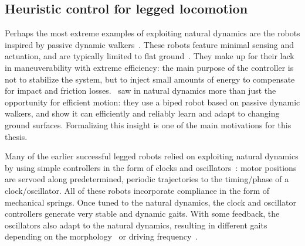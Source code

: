 \subsection{Heuristic control for legged locomotion}



Perhaps the most extreme examples of exploiting natural dynamics are the robots inspired by passive dynamic walkers~\cite{mcgeer1990passive}. These robots feature minimal sensing and actuation, and are typically limited to flat ground~\cite{bhounsule2012design,wisse2006design}. They make up for their lack in maneuverability with extreme efficiency: the main purpose of the controller is not to stabilize the system, but to inject small amounts of energy to compensate for impact and friction losses.~\textcite{tedrake2005learning} saw in natural dynamics more than just the opportunity for efficient motion: they use a biped robot based on passive dynamic walkers, and show it can efficiently and reliably learn and adapt to changing ground surfaces.
Formalizing this insight is one of the main motivations for this thesis. \par
Many of the earlier successful legged robots relied on exploiting natural dynamics by using simple controllers in the form of clocks and oscillators~\cite{sprowitz2013towards,buchli2006resonance,altendorfer2001rhex,owaki2013simple}: motor positions are servoed along predetermined, periodic trajectories to the timing/phase of a clock/oscillator. All of these robots incorporate compliance in the form of mechanical springs. Once tuned to the natural dynamics, the clock and oscillator controllers generate very stable and dynamic gaits. With some feedback, the oscillators also adapt to the natural dynamics, resulting in different gaits depending on the morphology~\cite{owaki2013simple} or driving frequency~\cite{owaki2013simple,owaki2017quadruped}. %
